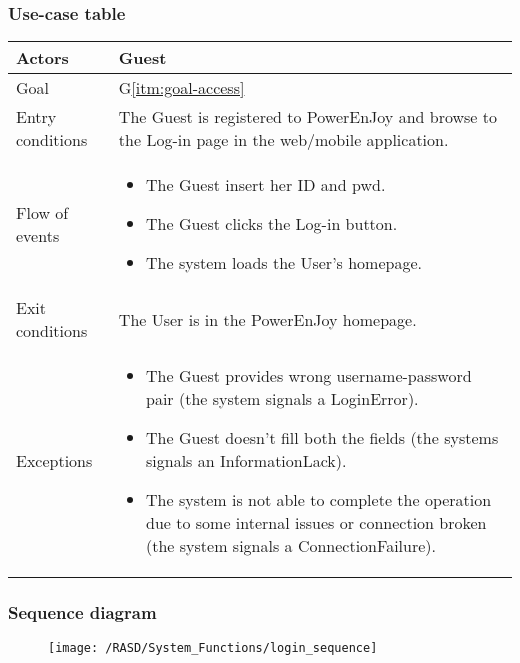 \subsubsection{Use-case table}
\begin{center}
  \begin{tabular}{ l | p{10cm} }
    \hline
    Actors & Guest\\ \hline
    Goal & G\ref{itm:goal-access}\\ \hline
    Entry conditions & The Guest is registered to PowerEnJoy and browse to the Log-in page in the web/mobile application. \\ \hline
    Flow of events &
\begin{itemize}
\item The Guest insert her \gls{ID} and \gls{pwd}.
\item The Guest clicks the Log-in button.
\item The system loads the User's homepage.
\end{itemize} \\ \hline
    Exit conditions & The User is in the PowerEnJoy homepage. \\ \hline
  Exceptions & 
\begin{itemize}
\item The Guest provides wrong username-password pair (the system signals a LoginError).
\item The Guest doesn't fill both the fields (the systems signals an InformationLack).
\item The system is not able to complete the operation due to some internal issues or connection broken (the system signals a ConnectionFailure).%
\end{itemize} \\ \hline
  \end{tabular}
\end{center}


\subsubsection{Sequence diagram}
\begin{figure}[!ht]
  \centering
  \vspace{0.1cm}
  \texttt{[image: /RASD/System\_Functions/login\_sequence]}\\
  \vspace{0.1cm}
  \label{fig:login_sequence} 
\end{figure}


